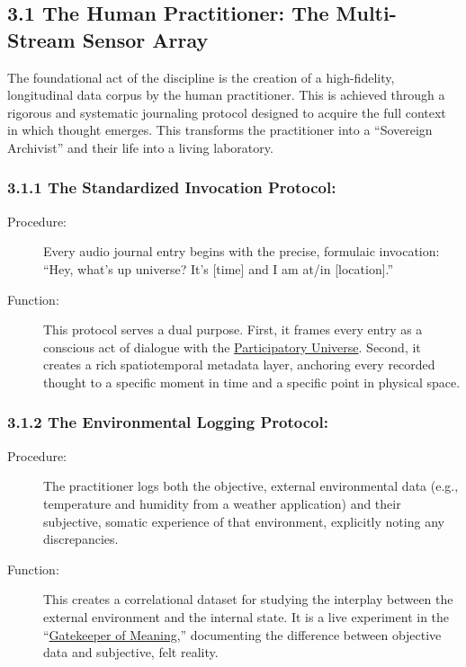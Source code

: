 \documentclass{article}
\begin{document}
\subsection*{3.1 The Human Practitioner: The Multi-Stream Sensor Array}
The foundational act of the discipline is the creation of a high-fidelity, longitudinal data corpus by the human practitioner. This is achieved through a rigorous and systematic journaling protocol designed to acquire the full context in which thought emerges. This transforms the practitioner into a ``Sovereign Archivist'' and their life into a living laboratory.

\subsubsection*{3.1.1 The Standardized Invocation Protocol:}
\begin{description}
    \item[Procedure:] Every audio journal entry begins with the precise, formulaic invocation: ``Hey, what's up universe? It's [time] and I am at/in [location].''
    \item[Function:] This protocol serves a dual purpose. First, it frames every entry as a conscious act of dialogue with the \hyperlink{gloss:participatory_universe}{Participatory Universe}. Second, it creates a rich spatiotemporal metadata layer, anchoring every recorded thought to a specific moment in time and a specific point in physical space.
\end{description}

\subsubsection*{3.1.2 The Environmental Logging Protocol:}
\begin{description}
    \item[Procedure:] The practitioner logs both the objective, external environmental data (e.g., temperature and humidity from a weather application) and their subjective, somatic experience of that environment, explicitly noting any discrepancies.
    \item[Function:] This creates a correlational dataset for studying the interplay between the external environment and the internal state. It is a live experiment in the ``\hyperlink{gloss:gatekeeper_of_meaning}{Gatekeeper of Meaning},'' documenting the difference between objective data and subjective, felt reality.
\end{description}
\end{document}
